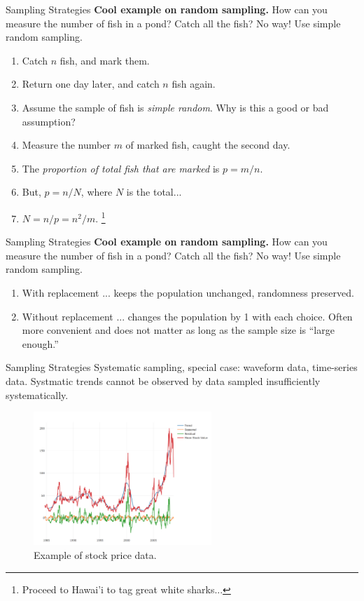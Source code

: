 \documentclass{beamer}
\begin{document}
\begin{frame}{Sampling Strategies}
\textbf{Cool example on random sampling.}  How can you measure the number of fish in a pond?  Catch all the fish?  No way!  Use simple random sampling.
\begin{enumerate}
\item Catch $n$ fish, and mark them.
\item Return one day later, and catch $n$ fish again.
\item Assume the sample of fish is \textit{simple random}.  Why is this a good or bad assumption?
\item Measure the number $m$ of marked fish, caught the second day.
\item The \textit{proportion of total fish that are marked} is $p = m/n$.
\item But, $p = n/N$, where $N$ is the total...
\item $N = n/p = n^2/m$. \vspace{0.5cm} \footnote{Proceed to Hawai'i to tag great white sharks...}
\end{enumerate}
\end{frame}

\begin{frame}{Sampling Strategies}
\textbf{Cool example on random sampling.}  How can you measure the number of fish in a pond?  Catch all the fish?  No way!  Use simple random sampling.
\begin{enumerate}
\item With replacement ... keeps the population unchanged, randomness preserved.
\item Without replacement ... changes the population by 1 with each choice.  Often more convenient and does not matter as long as the sample size is ``large enough.''
\end{enumerate}
\end{frame}

\begin{frame}{Sampling Strategies}
\alert{Systematic sampling}, special case: waveform data, time-series data.  Systmatic trends cannot be observed by data sampled insufficiently systematically.
\begin{figure}
\centering
\includegraphics[width=0.6\textwidth]{figures/stock.png}
\caption{Example of stock price data.}
\end{figure}
\end{frame}
\end{document}
